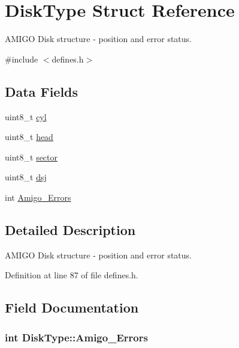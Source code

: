 \hypertarget{structDiskType}{}\section{Disk\+Type Struct Reference}
\label{structDiskType}


A\+M\+I\+GO Disk structure -\/ position and error status.  




{\ttfamily \#include $<$defines.\+h$>$}

\subsection*{Data Fields}
\begin{DoxyCompactItemize}
\item 
uint8\+\_\+t \hyperlink{structDiskType_a990d2a05bc2d8bf1328d0249202539e5}{cyl}
\item 
uint8\+\_\+t \hyperlink{structDiskType_ac4cc3cfd8e1fd4d6ec9dded35384786f}{head}
\item 
uint8\+\_\+t \hyperlink{structDiskType_a6f0a12d4184ccb30a7a5e6e6e713ca85}{sector}
\item 
uint8\+\_\+t \hyperlink{structDiskType_ad89ac2f4b87d861ae4ca3f185868b7da}{dsj}
\item 
int \hyperlink{structDiskType_acb6dbb1b64bfe620430bd235de22292b}{Amigo\+\_\+\+Errors}
\end{DoxyCompactItemize}


\subsection{Detailed Description}
A\+M\+I\+GO Disk structure -\/ position and error status. 

Definition at line 87 of file defines.\+h.



\subsection{Field Documentation}
\subsubsection[{\texorpdfstring{Amigo\+\_\+\+Errors}{Amigo_Errors}}]{\setlength{\rightskip}{0pt plus 5cm}int Disk\+Type\+::\+Amigo\+\_\+\+Errors}\hypertarget{structDiskType_acb6dbb1b64bfe620430bd235de22292b}{}\label{structDiskType_acb6dbb1b64bfe620430bd235de22292b}


